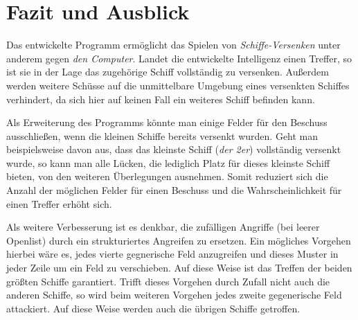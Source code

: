 \section{Fazit und Ausblick} \label{sec:Ausblick}

	Das entwickelte Programm ermöglicht das Spielen von \textit{Schiffe-Versenken} unter anderem gegen \textit{den Computer}. 
	Landet die entwickelte Intelligenz einen Treffer, so ist sie in der Lage das zugehörige Schiff vollständig zu versenken. 
	Außerdem werden weitere Schüsse auf die unmittelbare Umgebung eines versenkten Schiffes verhindert, da sich hier auf keinen Fall ein
	weiteres Schiff befinden kann.
	
	Als Erweiterung des Programms könnte man einige Felder für den Beschuss ausschließen, wenn die kleinen Schiffe bereits versenkt wurden.
	Geht man beispielsweise davon aus, dass das kleinste Schiff (\textit{der 2er}) vollständig versenkt wurde, so kann man alle 
	Lücken, die lediglich Platz für dieses kleinste Schiff bieten, von den weiteren Überlegungen ausnehmen. Somit reduziert sich die 
	Anzahl der möglichen Felder für einen Beschuss und die Wahrscheinlichkeit für einen Treffer erhöht sich.

	Als weitere Verbesserung ist es denkbar, die zufälligen Angriffe (bei leerer Openlist) durch ein strukturiertes Angreifen zu ersetzen.
	Ein mögliches Vorgehen hierbei wäre es, jedes vierte gegnerische Feld anzugreifen und dieses Muster in jeder Zeile um ein Feld zu verschieben.  
	Auf diese Weise ist das Treffen der beiden größten Schiffe garantiert. Trifft dieses Vorgehen durch Zufall nicht auch die anderen 
	Schiffe, so wird beim weiteren Vorgehen jedes zweite gegenerische Feld attackiert. Auf diese Weise werden auch die übrigen Schiffe getroffen.
		


